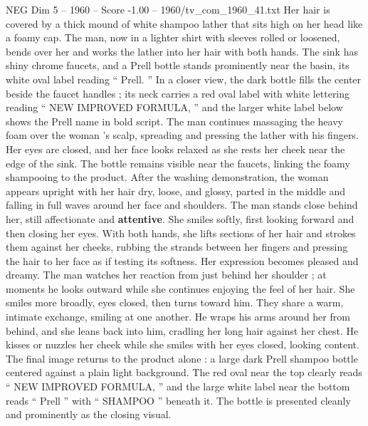 \begin{textsample}{NEG Dim 5 – 1960 – Score -1.00 – 1960/tv\_com\_1960\_41.txt}
Her hair is covered by a thick mound of white shampoo lather that sits high on her head like a foamy cap.
The man, now in a lighter shirt with sleeves rolled or loosened, bends over her and works the lather into her hair with both hands.
The sink has shiny chrome faucets, and a Prell bottle stands prominently near the basin, its white oval label reading “ Prell. ” In a closer view, the dark bottle fills the center beside the faucet handles ; its neck carries a red oval label with white lettering reading “ NEW IMPROVED FORMULA, ” and the larger white label below shows the Prell name in bold script.
The man continues massaging the heavy foam over the woman ’s scalp, spreading and pressing the lather with his fingers.
Her eyes are closed, and her face looks relaxed as she rests her cheek near the edge of the sink.
The bottle remains visible near the faucets, linking the foamy shampooing to the product.
After the washing demonstration, the woman appears upright with her hair dry, loose, and glossy, parted in the middle and falling in full waves around her face and shoulders.
The man stands close behind her, still affectionate and \textbf{attentive}.
She smiles softly, first looking forward and then closing her eyes.
With both hands, she lifts sections of her hair and strokes them against her cheeks, rubbing the strands between her fingers and pressing the hair to her face as if testing its softness.
Her expression becomes pleased and dreamy.
The man watches her reaction from just behind her shoulder ; at moments he looks outward while she continues enjoying the feel of her hair.
She smiles more broadly, eyes closed, then turns toward him.
They share a warm, intimate exchange, smiling at one another.
He wraps his arms around her from behind, and she leans back into him, cradling her long hair against her chest.
He kisses or nuzzles her cheek while she smiles with her eyes closed, looking content.
The final image returns to the product alone : a large dark Prell shampoo bottle centered against a plain light background.
The red oval near the top clearly reads “ NEW IMPROVED FORMULA, ” and the large white label near the bottom reads “ Prell ” with “ SHAMPOO ” beneath it.
The bottle is presented cleanly and prominently as the closing visual.

\end{textsample}
